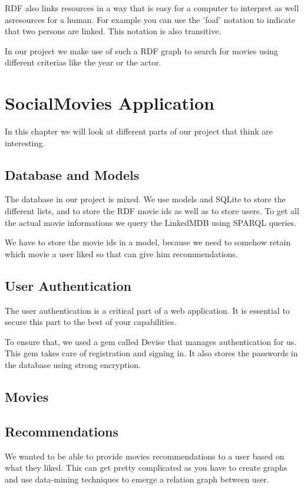 \documentclass[12pt,a4paper]{article}
\begin{document}
RDF also links resources in a way that is easy for a computer to interpret as well asresources for a human. For example you can use the 'foaf' notation to indicate that two persons are linked. This notation is also transitive.

In our project we make use of such a RDF graph to search for movies using different criterias like the year or the actor.

\section{SocialMovies Application}

In this chapter we will look at different parts of our project that think are interesting.

\subsection{Database and Models}
The database in our project is mixed. We use models and SQLite to store the different lists, and to store the RDF movie ids as well as to store users. To get all the actual movie informations we query the LinkedMDB using SPARQL queries.

We have to store the movie ids in a model, because we need to somehow retain which movie a user liked so that can give him recommendations.

\subsection{User Authentication}
The user authentication is a critical part of a web application. It is essential to secure this part to the best of your capabilities.

To ensure that, we used a gem called Devise that manages authentication for us. This gem takes care of registration and signing in. It also stores the passwords in the database using strong encryption.

\subsection{Movies}
\subsection{Recommendations}
We wanted to be able to provide movies recommendations to a user based on what they liked. This can get pretty complicated as you have to create graphs and use data-mining techniques to emerge a relation graph between user.
\end{document}
